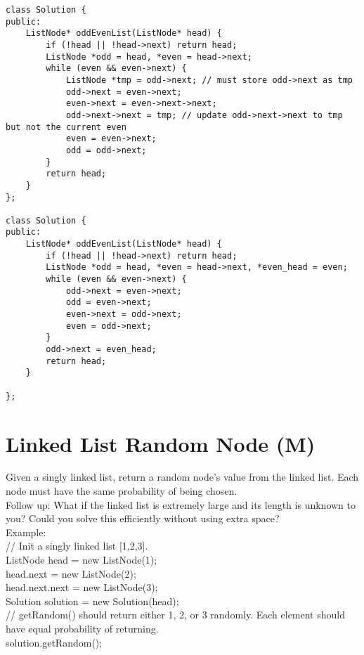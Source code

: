 \begin{lstlisting}
class Solution {
public:
    ListNode* oddEvenList(ListNode* head) {
        if (!head || !head->next) return head;
        ListNode *odd = head, *even = head->next;
        while (even && even->next) {
            ListNode *tmp = odd->next; // must store odd->next as tmp
            odd->next = even->next;
            even->next = even->next->next;
            odd->next->next = tmp; // update odd->next->next to tmp but not the current even
            even = even->next;
            odd = odd->next;
        }
        return head;
    }
};

class Solution {
public:
    ListNode* oddEvenList(ListNode* head) {
        if (!head || !head->next) return head;
        ListNode *odd = head, *even = head->next, *even_head = even;
        while (even && even->next) {
            odd->next = even->next;
            odd = even->next;
            even->next = odd->next;
            even = odd->next;
        }
        odd->next = even_head;
        return head;
    }

};
\end{lstlisting}


\section{Linked List Random Node (M)}
Given a singly linked list, return a random node's value from the linked list. Each node must have the same probability of being chosen.\\

Follow up:
What if the linked list is extremely large and its length is unknown to you? Could you solve this efficiently without using extra space?\\

Example:\\

// Init a singly linked list [1,2,3].\\
ListNode head = new ListNode(1);\\
head.next = new ListNode(2);\\
head.next.next = new ListNode(3);\\
Solution solution = new Solution(head);\\

// getRandom() should return either 1, 2, or 3 randomly. Each element should have equal probability of returning.\\
solution.getRandom();\\

